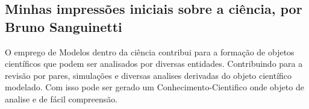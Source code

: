 \subsection{Minhas impressões iniciais sobre a ciência, por Bruno Sanguinetti}

O emprego de \gls{Modelos} dentro da ciência \citep{wikipedia_scientific_2022} contribui para a formação de objetos científicos que podem ser analisados por diversas entidades.
Contribuindo para a revisão por pares, simulações e diversas analises derivadas do objeto científico modelado. Com isso pode ser gerado um \gls{Conhecimento-Cientifico} onde objeto de analise e de fácil compreensão.
